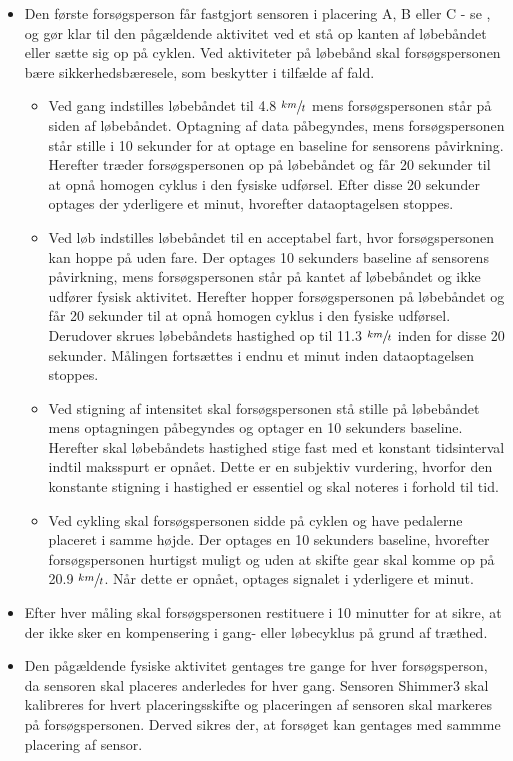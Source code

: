 \begin{itemize}
	\item Den første forsøgsperson får fastgjort sensoren i placering A, B eller C - se , og gør klar til den pågældende aktivitet ved et stå op kanten af løbebåndet eller sætte sig op på cyklen. Ved aktiviteter på løbebånd skal forsøgspersonen bære sikkerhedsbæresele, som beskytter i tilfælde af fald.
	\begin{itemize}
		\item Ved gang indstilles løbebåndet til 4.8 $\sfrac{km}{t}$ mens forsøgspersonen står på siden af løbebåndet. Optagning af data påbegyndes, mens forsøgspersonen står stille i 10 sekunder for at optage en baseline for sensorens påvirkning. Herefter træder forsøgspersonen op på løbebåndet og får 20 sekunder til at opnå homogen cyklus i den fysiske udførsel. Efter disse 20 sekunder optages der yderligere et minut, hvorefter dataoptagelsen stoppes.
		\item Ved løb indstilles løbebåndet til en acceptabel fart, hvor forsøgspersonen kan hoppe på uden fare. Der optages 10 sekunders baseline af sensorens påvirkning, mens forsøgspersonen står på kantet af løbebåndet og ikke udfører fysisk aktivitet. Herefter hopper forsøgspersonen på løbebåndet og får 20 sekunder til at opnå homogen cyklus i den fysiske udførsel. Derudover skrues løbebåndets hastighed op til 11.3 $\sfrac{km}{t}$ inden for disse 20 sekunder. Målingen fortsættes i endnu et minut inden dataoptagelsen stoppes.
		\item Ved stigning af intensitet skal forsøgspersonen stå stille på løbebåndet mens optagningen påbegyndes og optager en 10 sekunders baseline. Herefter skal løbebåndets hastighed stige fast med et konstant tidsinterval indtil maksspurt er opnået. Dette er en subjektiv vurdering, hvorfor den konstante stigning i hastighed er essentiel og skal noteres i forhold til tid.
		\item Ved cykling skal forsøgspersonen sidde på cyklen og have pedalerne placeret i samme højde. Der optages en 10 sekunders baseline, hvorefter forsøgspersonen hurtigst muligt og uden at skifte gear skal komme op på 20.9 $\sfrac{km}{t}$. Når dette er opnået, optages signalet i yderligere et minut.
	\end{itemize}
	\item Efter hver måling skal forsøgspersonen restituere i 10 minutter for at sikre, at der ikke sker en kompensering i gang- eller løbecyklus på grund af træthed. %
	\item Den pågældende fysiske aktivitet gentages tre gange for hver forsøgsperson, da sensoren skal placeres anderledes for hver gang. Sensoren Shimmer3 skal kalibreres for hvert placeringsskifte og placeringen af sensoren skal markeres på forsøgspersonen. Derved sikres der, at forsøget kan gentages med sammme placering af sensor.
\end{itemize}

